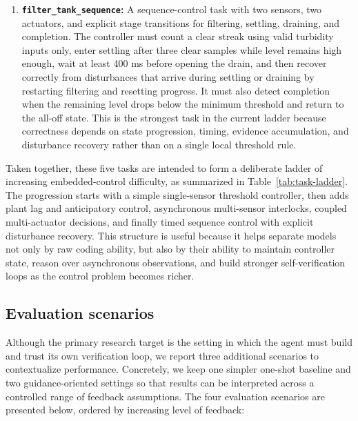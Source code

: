 \documentclass[a4paper,fleqn]{cas-dc}
\DeclareRobustCommand{\tool}[1]{\texttt{\nolinkurl{#1}}}
\begin{document}
\begin{enumerate}
    \item \textbf{\tool{filter_tank_sequence}:} A sequence-control task with two sensors, two actuators, and explicit stage transitions for filtering, settling, draining, and completion. The controller must count a clear streak using valid turbidity inputs only, enter settling after three clear samples while level remains high enough, wait at least 400 ms before opening the drain, and then recover correctly from disturbances that arrive during settling or draining by restarting filtering and resetting progress. It must also detect completion when the remaining level drops below the minimum threshold and return to the all-off state. This is the strongest task in the current ladder because correctness depends on state progression, timing, evidence accumulation, and disturbance recovery rather than on a single local threshold rule.
\end{enumerate}
Taken together, these five tasks are intended to form a deliberate ladder of increasing embedded-control difficulty, as summarized in Table~\ref{tab:task-ladder}. The progression starts with a simple single-sensor threshold controller, then adds plant lag and anticipatory control, asynchronous multi-sensor interlocks, coupled multi-actuator decisions, and finally timed sequence control with explicit disturbance recovery. This structure is useful because it helps separate models not only by raw coding ability, but also by their ability to maintain controller state, reason over asynchronous observations, and build stronger self-verification loops as the control problem becomes richer.


\subsection{Evaluation scenarios}
\label{sec:evaluation_scenarios}

Although the primary research target is the setting in which the agent must build and trust its own verification loop, we report three additional scenarios to contextualize performance. Concretely, we keep one simpler one-shot baseline and two guidance-oriented settings so that results can be interpreted across a controlled range of feedback assumptions. The four evaluation scenarios are presented below, ordered by increasing level of feedback:
\end{document}
